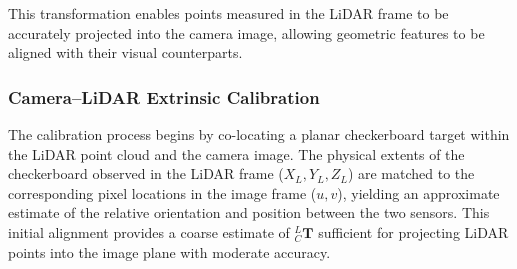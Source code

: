 \documentclass{erauthesis}
\begin{document}
This transformation enables points measured in the LiDAR frame to be accurately projected into the camera image, allowing geometric features to be aligned with their visual counterparts.

\subsubsection{Camera–LiDAR Extrinsic Calibration} \label{camLidar_calib}

The calibration process begins by co-locating a planar checkerboard target within the LiDAR point cloud and the camera image.  
The physical extents of the checkerboard observed in the LiDAR frame ($X_L, Y_L, Z_L$) are matched to the corresponding pixel locations in the image frame ($u,v$), yielding an approximate estimate of the relative orientation and position between the two sensors.  
This initial alignment provides a coarse estimate of $_{C}^{L}\mathbf{T}$ sufficient for projecting LiDAR points into the image plane with moderate accuracy.
\end{document}
